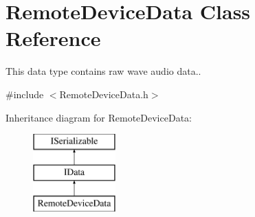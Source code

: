 \hypertarget{class_remote_device_data}{}\section{Remote\+Device\+Data Class Reference}
\label{class_remote_device_data}


This data type contains raw wave audio data..  




{\ttfamily \#include $<$Remote\+Device\+Data.\+h$>$}

Inheritance diagram for Remote\+Device\+Data\+:\begin{figure}[H]
\begin{center}
\leavevmode
\includegraphics[height=3.000000cm]{class_remote_device_data}
\end{center}
\end{figure}
